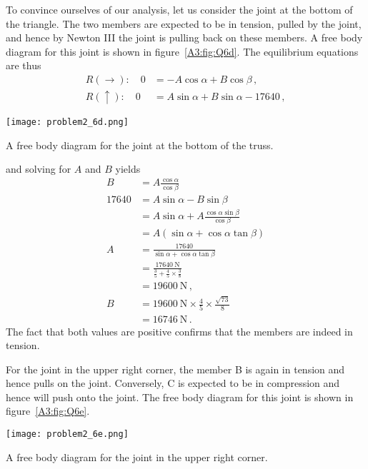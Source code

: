 \documentclass[a4paper,justified,oneside]{tufte-handout}
\numberwithin{equation}{subsection}
\begin{document}
\begin{solution}
To convince ourselves of our analysis, let us consider the joint at the bottom of the triangle. The two members are expected to be in tension, pulled by the joint, and hence by Newton III the joint is pulling back on these members. A free body diagram for this joint is shown in figure~\ref{A3:fig:Q6d}. The equilibrium equations are thus
\begin{align*}
	R(\rightarrow):\quad	0&=	-A\cos\alpha	+B\cos\beta	\,,	\\
	R(\uparrow):\quad		0&=	A\sin\alpha+B\sin\alpha-17640	\,,	
\end{align*}
\begin{marginfigure}[-20mm]
	\centering
	\texttt{[image: problem2\_6d.png]}
	\caption{A free body diagram for the joint at the bottom of the truss.}
	\label{A3:fig:Q6d}
\end{marginfigure}
and solving for $A$ and $B$ yields
\begin{align*}
		B	&=	A\frac{\cos\alpha}{\cos\beta}	\\
	17640	&=	A\sin\alpha	-B\sin\beta	\\
			&=	A\sin\alpha	+A\frac{\cos\alpha\sin\beta}{\cos\beta}	\\
			&=	A\left(\sin\alpha	+\cos\alpha\tan\beta\right)	\\
		A	&=	\frac{17640}{\sin\alpha	+\cos\alpha\tan\beta}	\\
			&=	\frac{\SI{17640}{\N}}{\frac{3}{5}	+\frac{4}{5}\times \frac{3}{8}}	\\
			&=	\SI{19600}{\N} \,,	\\
		B	&=	\SI{19600}{\N} \times\frac{4}{5} \times\frac{\sqrt{73}}{8}	\\
			&=	\SI{16746}{\N}	\,.
\end{align*}
The fact that both values are positive confirms that the members are indeed in tension.

For the joint in the upper right corner, the member B is again in tension and hence pulls on the joint. Conversely, C is expected to be in compression and hence will push onto the joint. The free body diagram for this joint is shown in figure~\ref{A3:fig:Q6e}.
\begin{marginfigure}[-20mm]
	\centering
	\texttt{[image: problem2\_6e.png]}
	\caption{A free body diagram for the joint in the upper right corner.}
	\label{A3:fig:Q6e}
\end{marginfigure}


\end{solution}
\end{document}
